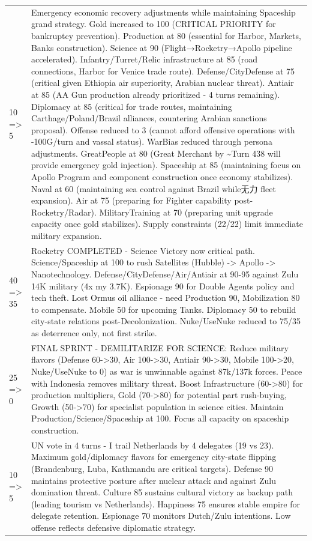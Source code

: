\begin{longtable}{p{}p{}}
10 => 5 & Emergency economic recovery adjustments while maintaining Spaceship grand strategy. Gold increased to 100 (CRITICAL PRIORITY for bankruptcy prevention). Production at 80 (essential for Harbor, Markets, Banks construction). Science at 90 (Flight→Rocketry→Apollo pipeline accelerated). Infantry/Turret/Relic infrastructure at 85 (road connections, Harbor for Venice trade route). Defense/CityDefense at 75 (critical given Ethiopia air superiority, Arabian nuclear threat). Antiair at 85 (AA Gun production already prioritized - 4 turns remaining). Diplomacy at 85 (critical for trade routes, maintaining Carthage/Poland/Brazil alliances, countering Arabian sanctions proposal). Offense reduced to 3 (cannot afford offensive operations with -100G/turn and vassal status). WarBias reduced through persona adjustments. GreatPeople at 80 (Great Merchant by \textasciitilde Turn 438 will provide emergency gold injection). Spaceship at 85 (maintaining focus on Apollo Program and component construction once economy stabilizes). Naval at 60 (maintaining sea control against Brazil while无力 fleet expansion). Air at 75 (preparing for Fighter capability post-Rocketry/Radar). MilitaryTraining at 70 (preparing unit upgrade capacity once gold stabilizes). Supply constraints (22/22) limit immediate military expansion. \\
40 => 35 & Rocketry COMPLETED - Science Victory now critical path. Science/Spaceship at 100 to rush Satellites (Hubble) -> Apollo -> Nanotechnology. Defense/CityDefense/Air/Antiair at 90-95 against Zulu 14K military (4x my 3.7K). Espionage 90 for Double Agents policy and tech theft. Lost Ormus oil alliance - need Production 90, Mobilization 80 to compensate. Mobile 50 for upcoming Tanks. Diplomacy 50 to rebuild city-state relations post-Decolonization. Nuke/UseNuke reduced to 75/35 as deterrence only, not first strike. \\
25 => 0 & FINAL SPRINT - DEMILITARIZE FOR SCIENCE: Reduce military flavors (Defense 60->30, Air 100->30, Antiair 90->30, Mobile 100->20, Nuke/UseNuke to 0) as war is unwinnable against 87k/137k forces. Peace with Indonesia removes military threat. Boost Infrastructure (60->80) for production multipliers, Gold (70->80) for potential part rush-buying, Growth (50->70) for specialist population in science cities. Maintain Production/Science/Spaceship at 100. Focus all capacity on spaceship construction. \\
10 => 5 & UN vote in 4 turns - I trail Netherlands by 4 delegates (19 vs 23). Maximum gold/diplomacy flavors for emergency city-state flipping (Brandenburg, Luba, Kathmandu are critical targets). Defense 90 maintains protective posture after nuclear attack and against Zulu domination threat. Culture 85 sustains cultural victory as backup path (leading tourism vs Netherlands). Happiness 75 ensures stable empire for delegate retention. Espionage 70 monitors Dutch/Zulu intentions. Low offense reflects defensive diplomatic strategy. \\
\end{longtable}
